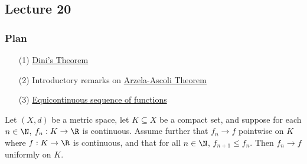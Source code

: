 \subsection{Lecture 20}

\subsubsection{Plan}

\begin{enumerate}
    \item[(1)] {\hyperref[Dini's Theorem]{Dini's Theorem}}
    \item[(2)] Introductory remarks on {\hyperref[the Arzela-Ascoli Theorem]{Arzela-Ascoli Theorem}}
    \item[(3)] {\hyperref[Equicontinuous sequence of functions]{Equicontinuous sequence of functions}} 
\end{enumerate}

\begin{theorem}\label{Dini's Theorem}
    Let \( (X,d) \) be a metric space, let \( K \subseteq  X   \) be a compact set, and suppose for each \( n \in \N  \), \( {f}_{n} : K \to \R  \) is continuous. Assume further that \( {f}_{n} \to f  \) pointwise on \( K  \) where \( f : K \to \R  \) is continuous, and that for all \( n \in \N  \), \( {f}_{n+1} \leq {f}_{n} \). Then \( {f}_{n} \to f  \) uniformly on \( K  \). 
\end{theorem}

